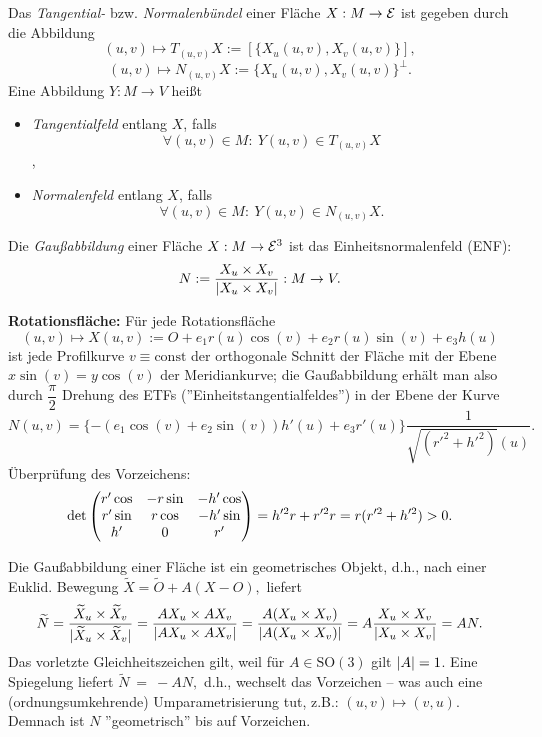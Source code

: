 \begin{definition}
	
	Das \emph{Tangential-} bzw. \emph{Normalenbündel} einer Fläche $ X: M \rightarrow \mathcal E $ ist gegeben durch die Abbildung 
		\[ (u,v) \mapsto T_{(u,v)}X := [ \{X_u(u,v),X_v(u,v)\} ], \]
		\[ (u,v) \mapsto N_{(u,v)}X := \{ X_u(u,v),X_v(u,v) \}^{\perp}. \]
	Eine Abbildung $ Y : M \rightarrow V $ heißt 
	
	\begin{itemize}
		
		\item \emph{Tangentialfeld} entlang $ X $, falls 
			\[ \forall (u,v) \in M: ~ Y(u,v) \in T_{(u,v)}X \],
			
		\item \emph{Normalenfeld} entlang $ X $, falls
			\[ \forall(u,v) \in M: ~ Y(u,v) \in N_{(u,v)}X. \]
		
	\end{itemize}

	Die \emph{Gaußabbildung} einer Fläche $ X: M \rightarrow \mathcal E^3 $ ist das Einheitsnormalenfeld (ENF):
		\[ N:= \dfrac{X_u \times X_v}{\left| X_u \times X_v\right|}: M \rightarrow V. \]
	
\end{definition}
	
\begin{example}
	\textbf{Rotationsfläche:}
	Für jede Rotationsfläche
		\[ (u,v) \mapsto X(u,v) := O + e_1r(u)\cos(v) + e_2 r(u) \sin(v) + e_3h(u) \]
	ist jede Profilkurve $ v \equiv \mathrm{const} $ der orthogonale Schnitt der Fläche mit der Ebene $ x\sin(v) = y \cos(v) $ der Meridiankurve; die Gaußabbildung erhält man also durch $ \dfrac{\pi}{2} $ Drehung des ETFs (''Einheitstangentialfeldes'') in der Ebene der Kurve 
		\[ N(u,v) = \{ -(e_1\cos(v) + e_2\sin(v))h'(u)+e_3r'(u) \} \dfrac{1}{\sqrt{(r'^2 + h'^2)}(u)}. \]
	Überprüfung des Vorzeichens:
	\[ \det \begin{pmatrix} r'\cos & -r\sin & -h'\cos \\ r'\sin & r\cos & -h'\sin \\ h' & 0 & r' \end{pmatrix} = h'^2r + r'^2r = r(r'^2 + h'^2) > 0. \]
	
\end{example}
	
\begin{remark}
	
	Die Gaußabbildung einer Fläche ist ein geometrisches Objekt, d.h.,
	nach einer Euklid. Bewegung $ \widetilde{X} = \widetilde{O} + A(X-O), $ liefert
		\[ \widetilde{N}=\dfrac{\widetilde{X}_u \times \widetilde{X}_v}{|\widetilde{X}_u \times \widetilde{X}_v|} = \dfrac{AX_u \times A X_v}{\left| AX_u \times AX_v\right|} = \dfrac{A(X_u \times X_v)}{\left| A(X_u \times X_v)\right|} = A \dfrac{X_u \times  X_v}{\left| X_u \times X_v\right|} = AN. \]
	Das vorletzte Gleichheitszeichen gilt, weil für $A \in \mathrm{SO}(3)$ gilt $ \left| A\right|=1 $. 
	Eine Spiegelung liefert $ \widetilde{N}~=~-AN, $ d.h., wechselt das Vorzeichen -- was auch eine (ordnungsumkehrende) Umparametrisierung tut, z.B.: $ (u,v) \mapsto(v,u) $.
	Demnach ist $ N $ ''geometrisch'' bis auf Vorzeichen.
	
\end{remark}

